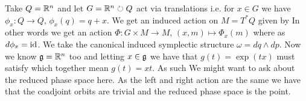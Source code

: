 \documentclass{article}
\begin{document}
\begin{example}
Take $Q = \mathbb{R}^n$ and let $G = \mathbb{R}^n \circlearrowright Q$ act via translations i.e. for $x \in G$ we have $\phi_x:Q \to Q, \, \phi_x(q) = q+x$. We get an induced action on $M = T^\ast Q$ given by 
In other words we get an action $\Phi : G \times M \to M, \, (x,m) \mapsto \Phi_x(m)$ where 
as $d\phi_x = \operatorname{id}$. We take the canonical induced symplectic structure $\omega = dq \wedge dp$. Now we know $\mathfrak{g} = \mathbb{R}^n$ too and letting $x \in \mathfrak{g}$ we have that $g(t) = \exp(tx)$ must satisfy 
which together mean $g(t) = xt$. As such 
We might want to ask about the reduced phase space here. As the left and right action are the same we have that the coadjoint orbits are trivial and the reduced phase space is 
the point.
\end{example}
\end{document}
